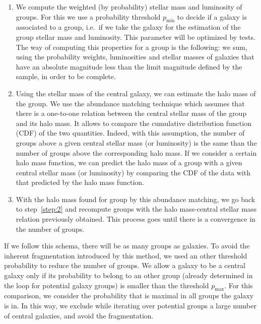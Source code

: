\begin{enumerate}
    \item We compute the weighted (by probability) stellar mass and luminosity
        of groups. For this we use a probability threshold $p_{\min}$ to decide
        if a galaxy is associated to a group, i.e.\ if we take the galaxy for
        the estimation of the group stellar mass and luminosity. This parameter
        will be optimized by tests. The way of computing this properties for a
        group is the following: we sum, using the probability weights,
        luminosities and stellar masses of galaxies that have an absolute
        magnitude less than the limit magnitude defined by the sample, in order
        to be complete.

    \item Using the stellar mass of the central galaxy, we can estimate the
        halo mass of the group. We use the abundance matching technique which
        assumes that there is a one-to-one relation between the central stellar
        mass of the group and its halo mass. It allows to compare the
        cumulative distribution function (CDF) of the two quantities. Indeed,
        with this assumption, the number of groups above a given central
        stellar mass (or luminosity) is the same than the number of groups
        above the corresponding halo mass. If we consider a certain halo mass
        function, we can predict the halo mass of a group with a given central
        stellar mass (or luminosity) by comparing the CDF of the data with that
        predicted by the halo mass function.

    \item With the halo mass found for group by this abundance matching, we
        go back to step~\ref{step:2} and recompute groups with the halo
        mass-central stellar mass relation previously obtained. This process
        goes until there is a convergence in the number of groups.
\end{enumerate}

If we follow this schema, there will be as many groups as galaxies. To avoid
the inherent fragmentation introduced by this method, we used an other
threshold probability to reduce the number of groups. We allow a galaxy to be a
central galaxy only if its probability to belong to an other group (already
determined in the loop for potential galaxy groups) is smaller than the
threshold $p_{\max}$. For this comparison, we consider the probability that is
maximal in all groups the galaxy is in. In this way, we exclude while iterating
over potential groups a large number of central galaxies, and avoid the
fragmentation.

